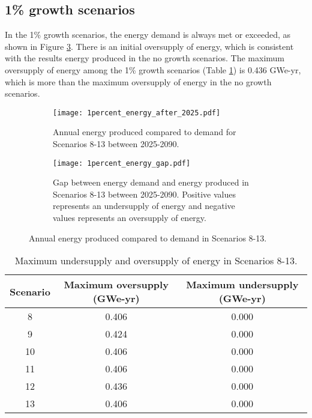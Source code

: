 \subsection{1\% growth scenarios}
In the 1\% growth scenarios, the energy demand is always 
met or exceeded, as shown in Figure \ref{fig:1percent_energy}. There is an 
initial oversupply of energy, which is consistent with the 
results energy produced in the no growth scenarios. The 
maximum oversupply of energy among the 1\% growth scenarios 
(Table \ref{tab:1percent_energy}) is 0.436 GWe-yr, which is more 
than the maximum oversupply of energy in the no growth 
scenarios. 

\begin{figure}[h!]
    \centering
    \begin{subfigure}[b]{0.45\textwidth}
        \centering
        \texttt{[image: 1percent\_energy\_after\_2025.pdf]}
        \caption{Annual energy produced compared to demand for Scenarios 8-13
        between 2025-2090.}
        \label{fig:1percent_energy_after_2025}
    \end{subfigure}
    \hfill
    \begin{subfigure}[b]{0.45\textwidth}
        \centering
        \texttt{[image: 1percent\_energy\_gap.pdf]}
        \caption{Gap between energy demand and energy produced in Scenarios 8-13
        between 2025-2090. Positive values represents an undersupply of energy 
        and negative values represents an oversupply of energy. }
        \label{fig:1percent_energy_gap}
    \end{subfigure}
       \caption{Annual energy produced compared to demand in Scenarios 8-13.}
       \label{fig:1percent_energy}
\end{figure}

\begin{table}[h!]
    \centering
    \caption{Maximum undersupply and oversupply of energy in Scenarios 8-13.}
    \label{tab:1percent_energy}
    \begin{tabular}{c c c}
        \hline 
        Scenario & Maximum oversupply (GWe-yr) & Maximum undersupply (GWe-yr) \\
        \hline 
        8 & 0.406 & 0.000 \\
        9 & 0.424 & 0.000 \\
        10 & 0.406 & 0.000 \\
        11 & 0.406 & 0.000 \\
        12 & 0.436 & 0.000 \\
        13 & 0.406 & 0.000 \\
        \hline
    \end{tabular}
\end{table}

